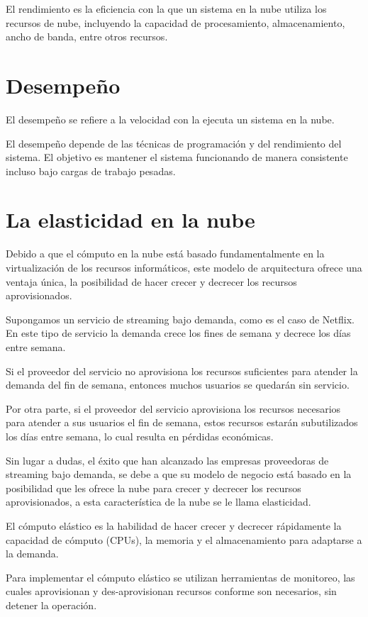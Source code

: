 \documentclass[11pt,a4paper,oneside]{book}
\begin{document}
El rendimiento es la eficiencia con la que un sistema en la nube utiliza los recursos de nube, incluyendo la capacidad de procesamiento, almacenamiento, ancho de banda, entre otros recursos.

\section{Desempeño}

El desempeño se refiere a la velocidad con la ejecuta un sistema en la nube.

El desempeño depende de las técnicas de programación y del rendimiento del sistema. El objetivo es mantener el sistema funcionando de manera consistente incluso bajo cargas de trabajo pesadas.

\section{La elasticidad en la nube}

Debido a que el cómputo en la nube está basado fundamentalmente en la virtualización de los recursos informáticos, este modelo de arquitectura ofrece una ventaja única, la posibilidad de hacer crecer y decrecer los recursos aprovisionados.

Supongamos un servicio de streaming bajo demanda, como es el caso de Netflix. En este tipo de servicio la demanda crece los fines de semana y decrece los días entre semana.

Si el proveedor del servicio no aprovisiona los recursos suficientes para atender la demanda del fin de semana, entonces muchos usuarios se quedarán sin servicio.

Por otra parte, si el proveedor del servicio aprovisiona los recursos necesarios para atender a sus usuarios el fin de semana, estos recursos estarán subutilizados los días entre semana, lo cual resulta en pérdidas económicas.

Sin lugar a dudas, el éxito que han alcanzado las empresas proveedoras de streaming bajo demanda, se debe a que su modelo de negocio está basado en la posibilidad que les ofrece la nube para crecer y decrecer los recursos aprovisionados, a esta característica de la nube se le llama elasticidad.

El cómputo elástico es la habilidad de hacer crecer y decrecer rápidamente la capacidad de cómputo (CPUs), la memoria y el almacenamiento para adaptarse a la demanda.

Para implementar el cómputo elástico se utilizan herramientas de monitoreo, las cuales aprovisionan y des-aprovisionan recursos conforme son necesarios, sin detener la operación.
\end{document}
